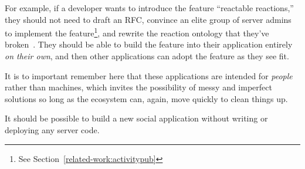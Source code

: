 For example, if a developer wants to introduce the feature
``reactable reactions,'' they should not need to draft an RFC,
convince an elite group of server admins to implement the feature\footnote{
    See Section~\ref{related-work:activitypub}
},
and rewrite the reaction ontology that they've broken~\cite{ecosystemmoving, herdingdnscamel, semanticwebtwodecades}.
They should be able to build the feature into their application
entirely \emph{on their own}, and then other applications can adopt the
feature as they see fit.

It is to important remember here that these applications are
intended for \emph{people} rather than machines, which invites
the possibility of messy and imperfect solutions so long as the ecosystem
can, again, move quickly to clean things up.



\begin{requirement}[Serverless]
\label{requirements:serverless}
    It should be possible to build a new social application without writing or deploying any server code.
\end{requirement}

